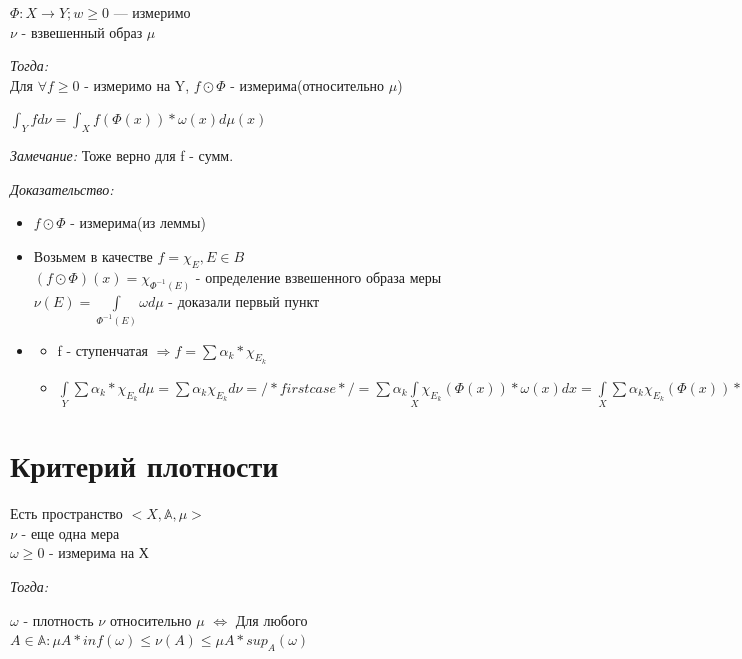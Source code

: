 \documentclass[paper=a4, fontsize=17pt]{article}
\begin{document}
		$\Phi: X\rightarrow Y; w \geq 0$ --- измеримо\\ $\nu$ - взвешенный образ $\mu$
		
		\emph{Тогда:}\\
		 Для $\forall f \geq 0$ - измеримо на Y, $f\odot \Phi$ - измерима(относительно $\mu$)
		
		$\int_{Y}f d\nu = \int_{X} f(\Phi(x)) * \omega(x) d\mu(x)$
		
		\emph{Замечание:} Тоже верно для f - сумм.
		
		\emph{Доказательство:} \\
	
			\begin{itemize}
				\item $f\odot \Phi$ - измерима(из леммы)
				\item Возьмем в качестве $f = \chi_{E} , E\in B$ \\
				$(f\odot \Phi)(x) = \chi_{\Phi^{-1}(E)}$ - определение взвешенного образа меры \\
				$\nu(E) = \int\limits_{\Phi^{-1}(E)}\omega d\mu$ - доказали первый пункт
				\item
				\begin{itemize}
					\item f - ступенчатая $\Rightarrow f = \sum \alpha_k * \chi_{E_k}$
					\item $\int\limits_{Y} \sum \alpha_k * \chi_{E_k} d\mu = \sum \alpha_k \chi_{E_k} d\nu = /* first case */ = \sum \alpha_k \int\limits_X \chi_{E_k}(\Phi(x))*\omega(x)dx = \int\limits_X \sum \alpha_k \chi_{E_k}(\Phi(x)) * \omega(x) d\mu(x) = \int f \odot \Phi * \omega d\mu$
				\end{itemize}
			\end{itemize}
\section{Критерий плотности}
	Есть пространство $<X, \mathbb{A}, \mu>$ \\
	$\nu$ - еще одна мера \\
	$\omega \geq 0$ - измерима на Х
	
	\emph{Тогда:}
	
	$\omega$ - плотность $\nu$ относительно $\mu$ $\Longleftrightarrow$ Для любого $A\in\mathbb{A}:\mu A * inf(\omega) \leq \nu(A) \leq \mu A * sup_A(\omega)$
	
\end{document}
